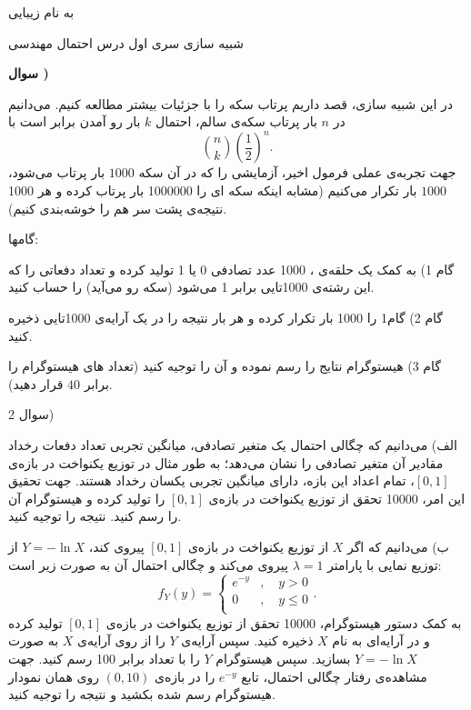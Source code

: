 \documentclass{article}
\newcounter{questionnumber}
\newcommand{\Q}{
\textbf{سوال \thequestionnumber)}
\stepcounter{questionnumber}
}
\begin{document}
\LARGE
\begin{center}

به نام زیبایی


شبیه سازی سری اول درس احتمال مهندسی

\end{center}
\hrulefill
\large

\Q

در این شبیه سازی، قصد داریم پرتاب سکه را با جزئیات بیشتر مطالعه کنیم. می‌دانیم در 
$
n
$
بار پرتاب سکه‌ی سالم، احتمال 
$
k
$
بار رو آمدن برابر است با
$$
\binom{n}{k}(\frac{1}{2})^n.
$$
جهت تجربه‌ی عملی فرمول اخیر، آزمایشی را که در آن سکه
$
1000
$
بار پرتاب می‌شود،
$
1000
$
بار تکرار می‌کنیم (مشابه اینکه سکه ای را 1000000 بار پرتاب کرده و هر 1000 نتیجه‌ی پشت سر هم را خوشه‌بندی کنیم).

گامها:

گام 1) به کمک یک حلقه‌ی ،
1000 عدد تصادفی 0 یا 1 تولید کرده و تعداد دفعاتی را که این رشته‌ی 1000تایی برابر 1 می‌شود (سکه رو می‌آید) را حساب کنید.

گام 2) گام1 را 1000 بار تکرار کرده و هر بار نتیجه را در یک آرایه‌ی 1000تایی ذخیره کنید.

گام 3) هیستوگرام نتایج را رسم نموده و آن را توجیه کنید (تعداد های هیستوگرام را برابر $40$ قرار دهید).

سوال 2)

الف) می‌دانیم که چگالی احتمال یک متغیر تصادفی، میانگین تجربی تعداد دفعات رخداد مقادیر آن متغیر تصادفی را نشان می‌دهد؛ به طور مثال در توزیع یکنواخت در بازه‌ی $[0,1]$، تمام اعداد این بازه، دارای میانگین تجربی یکسان رخداد هستند. جهت تحقیق این امر، 10000 تحقق از توزیع یکنواخت در بازه‌ی $[0,1]$ را تولید کرده و هیستوگرام آن را رسم کنید. نتیجه را توجیه کنید.

ب) می‌دانیم که اگر 
$
X
$
از توزیع یکنواخت در بازه‌ی 
$
[0,1]
$
پیروی کند، 
$
Y=-\ln X
$
از توزیع نمایی با پارامتر 
$
\lambda=1
$
پیروی می‌کند و چگالی احتمال آن به صورت زیر است:
$$
f_Y(y)=\begin{cases}
e^{-y}&,\quad y>0\\
0&,\quad y\le0\\
\end{cases}.
$$
به کمک دستور هیستوگرام، 10000 تحقق از توزیع یکنواخت در بازه‌ی 
$
[0,1]
$
تولید کرده و در آرایه‌ای به نام
$
X
$
ذخیره کنید. سپس آرایه‌ی
$
Y
$
را از روی آرایه‌ی
$
X
$
به صورت
$
Y=-\ln X
$
بسازید. سپس هیستوگرام $Y$ را با تعداد  برابر 100 رسم کنید. جهت مشاهده‌ی رفتار چگالی احتمال، تابع
$
e^{-y}
$
را در بازه‌ی 
$
(0,10)
$
روی همان نمودار هیستوگرام رسم شده بکشید و نتیجه را توجیه کنید.
\end{document}
